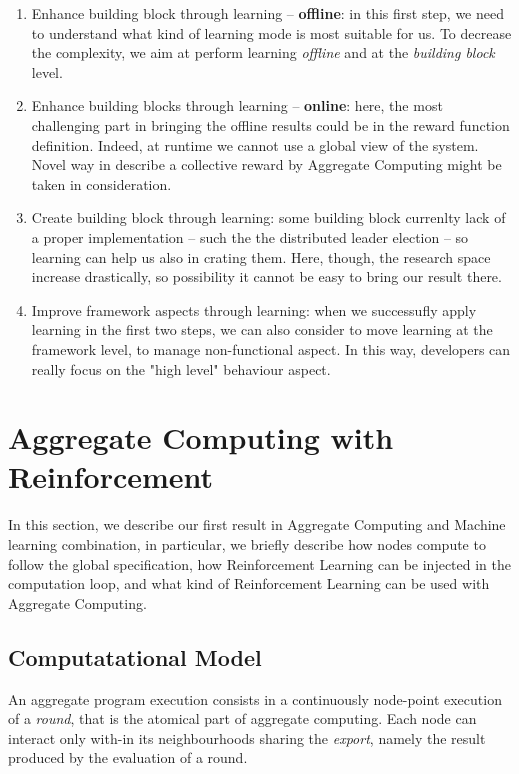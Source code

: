 \documentclass[
  twocolumn,
]{ceurart}
\begin{document}
\begin{enumerate}
  \item Enhance building block through learning -- \textbf{offline}: in this first step, we 
  need to understand what kind of learning mode is most suitable for us. To decrease the complexity,
  we aim at perform learning \textit{offline} and at the \textit{building block} level.
  \item Enhance building blocks through learning -- \textbf{online}: here, the most challenging part
  in bringing the offline results could be in the reward function definition. Indeed, at runtime
  we cannot use a global view of the system. Novel way in describe a collective reward by Aggregate Computing
  might be taken in consideration.
  \item Create building block through learning: some building block currenlty lack of a proper implementation -- 
  such the the distributed leader election -- so learning can help us also in crating them. 
  Here, though, the research space increase drastically, so possibility it cannot be easy to bring our 
  result there.
  \item Improve framework aspects through learning: when we successufly apply learning in the first two steps, 
  we can also consider to move learning at the framework level, to manage non-functional aspect. In this way,
  developers can really focus on the "high level" behaviour aspect.
\end{enumerate}

\section{Aggregate Computing with Reinforcement}
In this section, we describe our first result in Aggregate Computing and Machine learning combination,
 in particular, we briefly describe how nodes compute to follow the global specification,
 how Reinforcement Learning can be injected in the computation loop,
 and what kind of Reinforcement Learning can be used with Aggregate Computing.

\subsection{Computatational Model}
An aggregate program execution consists in a continuously node-point execution of a \textit{round}, that is
 the atomical part of aggregate computing.
%
Each node can interact only with-in its neighbourhoods sharing the \textit{export}, namely the result produced by
 the evaluation of a round.
\end{document}

